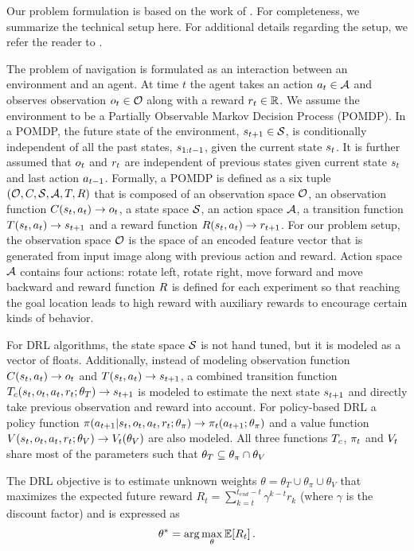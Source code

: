 Our problem formulation is based on the work of \cite{MiPaViICLR2017}. 
For completeness, we summarize the technical setup here.
For additional details regarding the setup, we refer the reader to \cite{MnBaMiICML2016,MiPaViICLR2017}.

The problem of navigation is formulated as an interaction between an environment and an agent.
At time $t$ the agent takes an action $a_t \in \mathcal{A}$ and observes observation $o_t \in \mathcal{O}$ along with a reward $r_t \in \mathbb{R}$.
We assume the environment to be a Partially Observable Markov Decision Process (POMDP).
In a POMDP, the future state of the environment, $s_{t+1} \in \mathcal{S}$, is conditionally independent of all the past states, $s_{1:t-1}$, given the current state $s_t$. It is further assumed that
$o_t$ and $r_t$ are independent of previous states given current state $s_t$ and last action $a_{t-1}$.
Formally, a POMDP is defined as a six tuple $(\mathcal{O}, C, \mathcal{S}, \mathcal{A}, T, R)$ that is composed of an observation space $\mathcal{O}$, an observation function $C(s_t, a_t) \rightarrow o_t$, a state space $\mathcal{S}$, an action space $\mathcal{A}$, a transition function $T(s_t, a_t) \rightarrow s_{t+1}$ and a reward function $R(s_t, a_t) \rightarrow r_{t+1}$.
For our problem setup, the observation space $\mathcal{O}$ is the space of an encoded feature vector that is generated from input image along with previous action and reward.
Action space $\mathcal{A}$ contains four actions: rotate left, rotate right, move forward and move backward and reward function $R$ is defined for each experiment so that reaching the goal location leads to high reward with auxiliary rewards to encourage certain kinds of behavior.

For DRL algorithms, the state space $\mathcal{S}$ is not hand tuned, but it is modeled as a vector of floats.
Additionally, instead of modeling observation function $C(s_t, a_t) \rightarrow o_t$ and $T(s_t, a_t) \rightarrow s_{t+1}$, a combined transition function $T_c(s_t, o_t, a_t, r_t; \theta_T) \rightarrow s_{t+1}$ is modeled to estimate the next state $s_{t+1}$ and directly take previous observation and reward into account.
For policy-based DRL a policy function $\pi(a_{t+1}|s_t, o_t, a_t, r_t; \theta_\pi) \rightarrow \pi_t(a_{t+1} ; \theta_\pi)$ and a value function $V(s_t, o_t, a_t, r_t; \theta_V) \rightarrow V_t(\theta_V)$ are also modeled.
All three functions $T_c$, $\pi_t$ and $V_t$ share most of the parameters such that $\theta_T \subseteq \theta_{\pi} \cap \theta_V$

The DRL objective is to estimate unknown weights $\theta = \theta_T \cup \theta_\pi \cup \theta_V$ that maximizes the expected future reward $R_t = \sum_{k=t}^{t_{end} - t} \gamma^{k-t} r_k$ (where $\gamma$ is the discount factor) and is expressed as
%
\begin{align}
\theta^* = \arg\max_{\theta} \mathbb{E}[R_t] \,.
\end{align}
%
%

